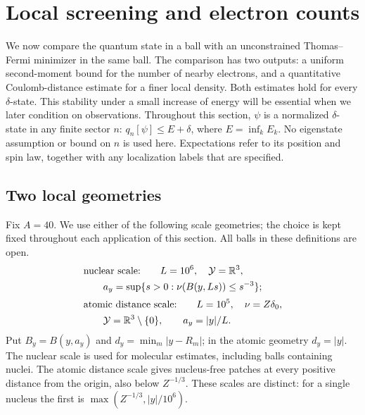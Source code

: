 \section{Local screening and electron counts}\label{sec:screening}\label{m:sec:screening}\label{a:sec:screening}

We now compare the quantum state in a ball with an unconstrained
Thomas--Fermi minimizer in the same ball.  The comparison has two outputs:
a uniform second-moment bound for the number of nearby electrons, and a
quantitative Coulomb-distance estimate for a finer local density.  Both
estimates hold for every $\delta$-state.  This stability under a small
increase of energy will be essential when we later condition on observations.
Throughout this section, $\psi$ is a normalized $\delta$-state in any finite
sector $n$: $q_n[\psi]\le E+\delta$, where
$E=\inf_k E_k$.  No eigenstate assumption or bound on $n$ is used here.
Expectations refer to its position and spin law, together with any
localization labels that are specified.

\subsection{Two local geometries}

Fix $A=40$.  We use either of the following scale geometries; the
choice is kept fixed throughout each application of this section.
All balls in these definitions are open.
\begin{equation}\label{m:eq:screen-scale}
 \begin{aligned}
 &\text{nuclear scale:}\qquad L=10^6,\quad\mathcal Y=\mathbb R^3,\\
 &\hspace{2em}a_y=\sup\{s>0:\nu(B(y,Ls))\le s^{-3}\};\\[.4ex]
 &\text{atomic distance scale:}\qquad L=10^5,\quad
 \nu=Z\delta_0,\\
 &\hspace{2em}\mathcal Y=\mathbb R^3\setminus\{0\},\qquad a_y=|y|/L.
 \end{aligned}
\end{equation}
Put $B_y=B(y,a_y)$ and $d_y=\min_m|y-R_m|$; in the atomic
geometry $d_y=|y|$.  The nuclear scale is used for molecular
estimates, including balls containing nuclei.  The atomic distance
scale gives nucleus-free patches at every positive distance from the
origin, also below $Z^{-1/3}$.  These scales are distinct: for a single
nucleus the first is $\max(Z^{-1/3},|y|/10^6)$.

